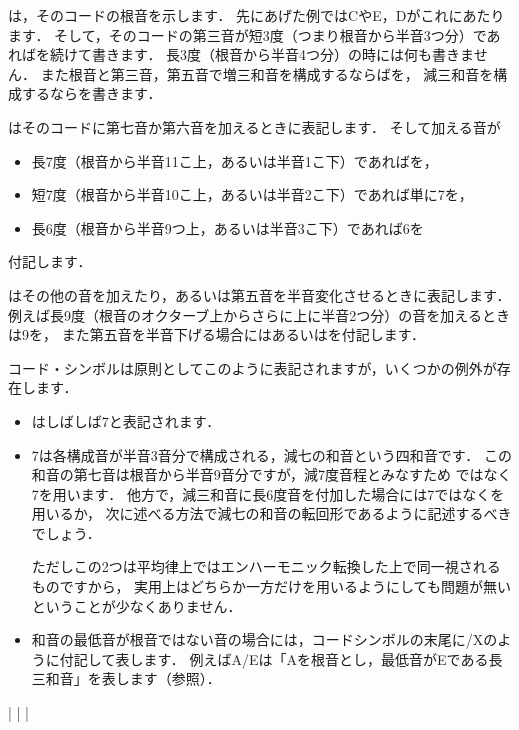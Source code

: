 \documentclass[dvipdfmx,uplatex,b5paper,openany,jbase=12Q,nomag*,textwidth-limit=44%
               ]{gachimuchi}
\begin{document}
\txCirc は，そのコードの根音を示します．
先にあげた例ではCやE\aFlat ，Dがこれにあたります．
そして，そのコードの第三音が短3度（つまり根音から半音3つ分）であれば\Min を続けて書きます．
長3度（根音から半音4つ分）の時には何も書きません．
また根音と第三音，第五音で増三和音を構成するならば\Aug を，
減三和音を構成するなら\Dimt を書きます．

\txSqr はそのコードに第七音か第六音を加えるときに表記します．
そして加える音が
\begin{itemize}
  \item 長7度（根音から半音11こ上，あるいは半音1こ下）であればを，
  \item 短7度（根音から半音10こ上，あるいは半音2こ下）であれば単に\subsc7を，
  \item 長6度（根音から半音9つ上，あるいは半音3こ下）であれば\subsc6を
\end{itemize}
付記します．

\txTri はその他の音を加えたり，あるいは第五音を半音変化させるときに表記します．
例えば長9度（根音のオクターブ上からさらに上に半音2つ分）の音を加えるときは\supsc9を，
また第五音を半音下げる場合にはあるいはを付記します．

コード・シンボルは原則としてこのように表記されますが，いくつかの例外が存在します．
\begin{itemize}
  \item \txCirc\Min{}はしばしば\txCirc\hDim\subsc7と表記されます．
  \item \txCirc\Dim\subsc7は各構成音が半音3音分で構成される，減七の和音という四和音です．
        この和音の第七音は根音から半音9音分ですが，減7度音程とみなすため
        \Min{}ではなく\Dim\subsc7を用います．
        他方で，減三和音に長6度音を付加した場合には\Dim\subsc7ではなく\Min{}を用いるか，
        次に述べる方法で減七の和音の転回形であるように記述するべきでしょう．
        
        ただしこの2つは平均律上ではエンハーモニック転換した上で同一視されるものですから，
        実用上はどちらか一方だけを用いるようにしても問題が無いということが少なくありません．
  \item 和音の最低音が根音ではない音の場合には，コードシンボルの末尾に/Xのように付記して表します．
        例えばA/Eは「Aを根音とし，最低音がEである長三和音」を表します（参照）．
\end{itemize}
\begin{floatMusic}[pos=ht,width=0.9\linewidth]
  \Startpiece%
  \Notes%
  \zchordsu{}|%
  \en%
  \Notes%
  |%
  \en%
  \Notes%
  |%
  \en\setdoublebar%
  \endpiece%
\end{floatMusic}
\end{document}
